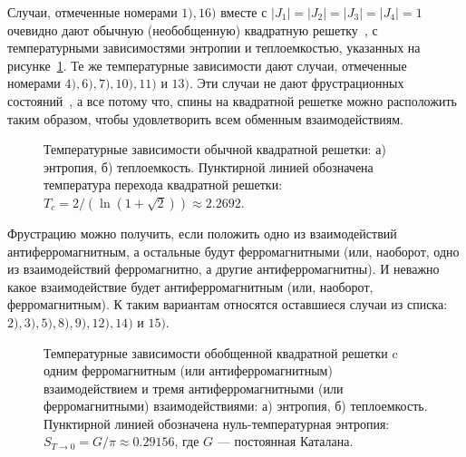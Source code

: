 Случаи, отмеченные номерами $1), 16)$ вместе с $|J_1| = |J_2| = |J_3| = |J_4| = 1$ очевидно дают обычную (необобщенную) квадратную решетку~\cite{onsager1941}, с температурными зависимостями энтропии и теплоемкостью, указанных на рисунке~\ref{SimpleSquareLattice}. Те же температурные зависимости дают случаи, отмеченные номерами $4), 6), 7), 10), 11)$ и $13)$. Эти случаи не дают фрустрационных состояний~\cite{toulouse1977, vannimenus1977}, а все потому что, спины на квадратной решетке можно расположить таким образом, чтобы удовлетворить всем обменным взаимодействиям.

\begin{figure}[h]
	\begin{minipage}[h]{0.5\linewidth}
	\end{minipage}
	\hfill
	\begin{minipage}[h]{0.5\linewidth}
	\end{minipage}
	\caption{Температурные зависимости обычной квадратной решетки: а) энтропия, б) теплоемкость. Пунктирной линией обозначена температура перехода квадратной решетки: $T_c = 2/(\ln(1+\sqrt{2}))\approx 2.2692$.}
	\label{SimpleSquareLattice}
\end{figure}

Фрустрацию можно получить, если положить одно из взаимодействий антиферромагнитным, а остальные будут ферромагнитными (или, наоборот, одно из взаимодействий ферромагнитно, а другие антиферромагнитны). И неважно какое взаимодействие будет антиферромагнитным (или, наоборот, ферромагнитным). К таким вариантам относятся оставшиеся случаи из списка: $2), 3), 5), 8), 9), 12), 14)$ и $15)$.

\begin{figure}[h]
	\begin{minipage}[h]{0.5\linewidth}
	\end{minipage}
	\hfill
	\begin{minipage}[h]{0.5\linewidth}
	\end{minipage}
	\caption{Температурные зависимости обобщенной квадратной решетки c одним ферромагнитным (или антиферромагнитным) взаимодействием и тремя антиферромагнитными (или ферромагнитными) взаимодействиями: а) энтропия, б) теплоемкость. Пунктирной линией обозначена нуль-температурная энтропия: $S_{T\rightarrow 0} = G/\pi\approx 0.29156$, где $G$ --- постоянная Каталана.}
	\label{Catalan}
\end{figure}

